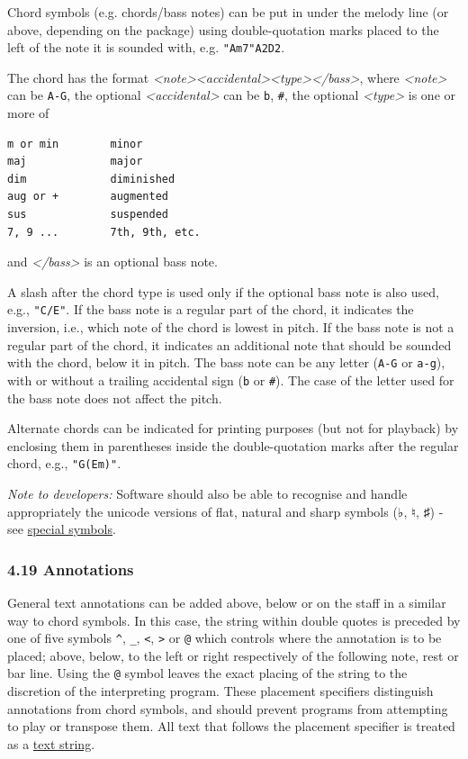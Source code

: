 \documentclass[oneside]{book}
\begin{document}
Chord symbols (e.g. chords/bass notes) can be put in under the melody
line (or above, depending on the package) using double-quotation marks
placed to the left of the note it is sounded with, e.g.
\texttt{"Am7"A2D2}.

The chord has the format
\emph{\textless{}note\textgreater{}\textless{}accidental\textgreater{}\textless{}type\textgreater{}\textless{}/bass\textgreater{}},
where \emph{\textless{}note\textgreater{}} can be \texttt{A-G}, the
optional \emph{\textless{}accidental\textgreater{}} can be \texttt{b},
\texttt{\#}, the optional \emph{\textless{}type\textgreater{}} is one or
more of

\begin{verbatim}
m or min        minor
maj             major
dim             diminished
aug or +        augmented
sus             suspended
7, 9 ...        7th, 9th, etc.
\end{verbatim}

and \emph{\textless{}/bass\textgreater{}} is an optional bass note.

A slash after the chord type is used only if the optional bass note is
also used, e.g., \texttt{"C/E"}. If the bass note is a regular part of
the chord, it indicates the inversion, i.e., which note of the chord is
lowest in pitch. If the bass note is not a regular part of the chord, it
indicates an additional note that should be sounded with the chord,
below it in pitch. The bass note can be any letter (\texttt{A-G} or
\texttt{a-g}), with or without a trailing accidental sign (\texttt{b} or
\texttt{\#}). The case of the letter used for the bass note does not
affect the pitch.

Alternate chords can be indicated for printing purposes (but not for
playback) by enclosing them in parentheses inside the double-quotation
marks after the regular chord, e.g., \texttt{"G(Em)"}.

\emph{Note to developers:} Software should also be able to recognise and
handle appropriately the unicode versions of flat, natural and sharp
symbols (♭, ♮, ♯) - see \protect\hyperlink{special_symbols}{special
symbols}.

\hypertarget{annotations}{\subsubsection{4.19
Annotations}\label{annotations}}

General text annotations can be added above, below or on the staff in a
similar way to chord symbols. In this case, the string within double
quotes is preceded by one of five symbols \texttt{\^{}}, \texttt{\_},
\texttt{\textless{}}, \texttt{\textgreater{}} or \texttt{@} which
controls where the annotation is to be placed; above, below, to the left
or right respectively of the following note, rest or bar line. Using the
\texttt{@} symbol leaves the exact placing of the string to the
discretion of the interpreting program. These placement specifiers
distinguish annotations from chord symbols, and should prevent programs
from attempting to play or transpose them. All text that follows the
placement specifier is treated as a
\protect\hyperlink{text_string_definition}{text string}.
\end{document}
